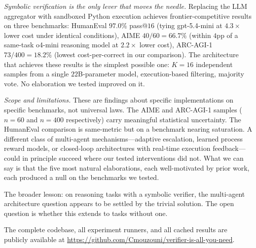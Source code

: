 \documentclass[11pt]{amsart}
\newcommand\1{{\mathds{1}}}
\theoremstyle{definition}
\theoremstyle{remark}
\numberwithin{equation}{section}
\begin{document}
\emph{Symbolic verification is the only lever that moves the needle.}
Replacing the LLM aggregator with sandboxed Python execution achieves frontier-competitive results on three benchmarks:
HumanEval $97.0\%$ pass@$16$ (tying gpt-5.4-mini at $4.3\times$ lower cost under identical conditions),
AIME $40/60 = 66.7\%$ (within $4$pp of a same-task o4-mini reasoning model at $2.2\times$ lower cost),
ARC-AGI-1 $73/400 = 18.2\%$ (lowest cost-per-correct in our comparison).
The architecture that achieves these results is the simplest possible one: $K\!=\!16$ independent samples from a single $22$B-parameter model, execution-based filtering, majority vote.
No elaboration we tested improved on it.

\emph{Scope and limitations.}
These are findings about specific implementations on specific benchmarks, not universal laws.
The AIME and ARC-AGI-1 samples ($n = 60$ and $n = 400$ respectively) carry meaningful statistical uncertainty.
The HumanEval comparison is same-metric but on a benchmark nearing saturation.
A different class of multi-agent mechanisms---adaptive escalation, learned process reward models, or closed-loop architectures with real-time execution feedback---could in principle succeed where our tested interventions did not.
What we can say is that the five most natural elaborations, each well-motivated by prior work, each produced a null on the benchmarks we tested.

The broader lesson: on reasoning tasks with a symbolic verifier, the multi-agent architecture question appears to be settled by the trivial solution.
The open question is whether this extends to tasks without one.

The complete codebase, all experiment runners, and all cached results are publicly available at \url{https://github.com/Cmouzouni/verifier-is-all-you-need}.
\end{document}
